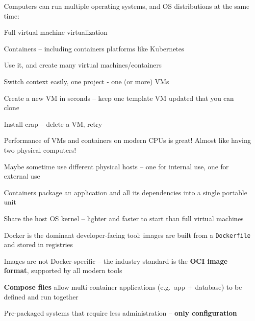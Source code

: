 \documentclass[Screen16to9,17pt]{foils}
\begin{document}

Computers can run multiple operating systems, and OS distributions at the same time:
\begin{list2}
\item Full virtual machine virtualization
\item Containers -- including containers platforms like Kubernetes
\item Use it, and create many virtual machines/containers
\item Switch context easily, one project - one (or more) VMs
\item Create a new VM in seconds -- keep one template VM updated that you can clone
\item Install crap -- delete a VM, retry
\item Performance of VMs and containers on modern CPUs is great! Almost like having two physical computers!
\end{list2}

Maybe sometime use different physical hosts -- one for internal use, one for external use








\begin{list2}
\item Containers package an application and all its dependencies into a single portable unit
\item Share the host OS kernel -- lighter and faster to start than full virtual machines
\item Docker is the dominant developer-facing tool; images are built from a \verb+Dockerfile+ and stored in registries
\item Images are not Docker-specific -- the industry standard is the {\bf OCI image format}, supported by all modern tools
\item {\bf Compose files} allow multi-container applications (e.g.\ app + database) to be defined and run together
\item Pre-packaged systems that require less administration -- {\bf only configuration}
\end{list2}


\end{document}
